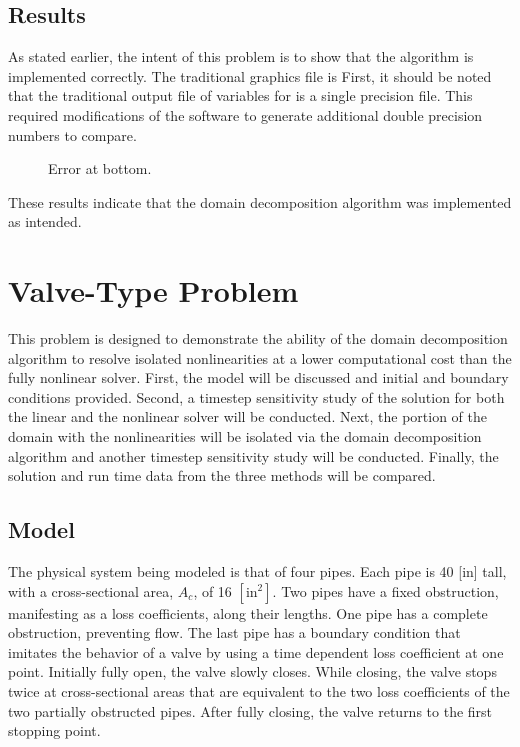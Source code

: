 \subsection{Results}
\label{sect:complexResults}

As stated earlier, the intent of this problem is to show that the algorithm is implemented correctly.
The traditional \cobra{} graphics file is 
First, it should be noted that the traditional output file of variables for \cobra{} is a single precision file.
This required modifications of the software to generate additional double precision numbers to compare.


\begin{figure}[h!t]
\centering

\caption{Error at bottom.}
\label{fig:complexBar}
\end{figure}

These results indicate that the domain decomposition algorithm was implemented as intended.

\section{Valve-Type Problem}
\label{sect:valveProblem}

This problem is designed to demonstrate the ability of the domain decomposition algorithm to resolve isolated nonlinearities at a lower computational cost than the fully nonlinear solver. 
First, the model will be discussed and initial and boundary conditions provided.
Second, a timestep sensitivity study of the solution for both the linear and the nonlinear solver will be conducted.
Next, the portion of the domain with the nonlinearities will be isolated via the domain decomposition algorithm and another timestep sensitivity study will be conducted.
Finally, the solution and run time data from the three methods will be compared.

\subsection{Model}
\label{subsect:valveModel}

The physical system being modeled is that of four pipes.
Each pipe is 40 [in] tall, with a cross-sectional area, $ A_{c} $, of 16 $[\text{in}^{2}]$.
Two pipes have a fixed obstruction, manifesting as a loss coefficients, along their lengths.
One pipe has a complete obstruction, preventing flow.
The last pipe has a boundary condition that imitates the behavior of a valve by using a  time dependent loss coefficient at one point.
Initially fully open, the valve slowly closes.
While closing, the valve stops twice at cross-sectional areas that are equivalent to the two loss coefficients of the two partially obstructed pipes.
After fully closing, the valve returns to the first stopping point.

